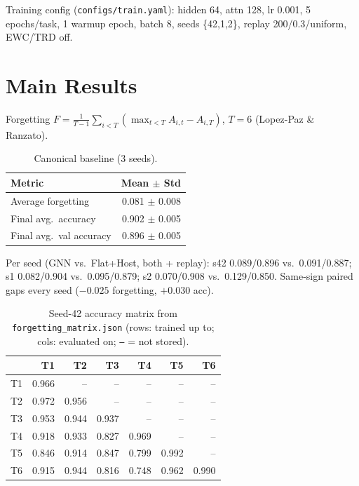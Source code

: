 \documentclass[10pt,a4paper,twocolumn]{article}
\begin{document}
Training config (\texttt{configs/train.yaml}): hidden 64, attn 128, lr 0.001, 5 epochs/task, 1 warmup epoch, batch 8, seeds \{42,1,2\}, replay 200/0.3/uniform, EWC/TRD off.

\section{Main Results}
Forgetting $F=\frac{1}{T-1}\sum_{i<T}(\max_{t<T}A_{i,t}-A_{i,T})$, $T=6$ (Lopez-Paz \& Ranzato).

\begin{table}[htbp]
\centering\footnotesize
\caption{Canonical baseline (3 seeds).}
\label{tab:baseline}
\begin{tabular}{lr}
\toprule
Metric & Mean $\pm$ Std \\
\midrule
Average forgetting & \num{0.081} $\pm$ \num{0.008} \\
Final avg.\ accuracy & \num{0.902} $\pm$ \num{0.005} \\
Final avg.\ val accuracy & \num{0.896} $\pm$ \num{0.005} \\
\bottomrule
\end{tabular}
\end{table}

Per seed (GNN vs.\ Flat+Host, both + replay): s42 0.089/0.896 vs.\ 0.091/0.887; s1 0.082/0.904 vs.\ 0.095/0.879; s2 0.070/0.908 vs.\ 0.129/0.850. Same-sign paired gaps every seed ($-0.025$ forgetting, $+0.030$ acc).

\begin{table}[htbp]
\centering\footnotesize
\caption{Seed-42 accuracy matrix from \texttt{forgetting\_matrix.json} (rows: trained up to; cols: evaluated on; \texttt{--} = not stored).}
\label{tab:matrix}
\begin{tabular}{lrrrrrr}
\toprule
 & T1 & T2 & T3 & T4 & T5 & T6 \\
\midrule
T1 & 0.966 & -- & -- & -- & -- & -- \\
T2 & 0.972 & 0.956 & -- & -- & -- & -- \\
T3 & 0.953 & 0.944 & 0.937 & -- & -- & -- \\
T4 & 0.918 & 0.933 & 0.827 & 0.969 & -- & -- \\
T5 & 0.846 & 0.914 & 0.847 & 0.799 & 0.992 & -- \\
T6 & 0.915 & 0.944 & 0.816 & 0.748 & 0.962 & 0.990 \\
\bottomrule
\end{tabular}
\end{table}
\end{document}
